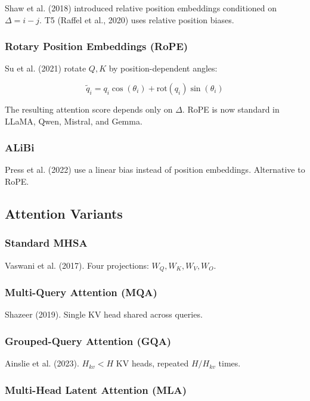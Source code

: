 {Shaw et al. (2018) introduced relative position embeddings conditioned on 
$\Delta = i - j$. T5 (Raffel et al., 2020) uses relative position biases.

\subsubsection{Rotary Position Embeddings (RoPE)}

Su et al. (2021) rotate $Q, K$ by position-dependent angles:

\[
\tilde{q}_i = q_i \cos(\theta_i) + \mathrm{rot}(q_i) \sin(\theta_i)
\tag{2.1}
\]

The resulting attention score depends only on $\Delta$. RoPE is now 
standard in LLaMA, Qwen, Mistral, and Gemma.

\subsubsection{ALiBi}

Press et al. (2022) use a linear bias instead of position embeddings. 
Alternative to RoPE.

\subsection{Attention Variants}

\subsubsection{Standard MHSA}

Vaswani et al. (2017). Four projections: $W_Q, W_K, W_V, W_O$.

\subsubsection{Multi-Query Attention (MQA)}

Shazeer (2019). Single KV head shared across queries.

\subsubsection{Grouped-Query Attention (GQA)}

Ainslie et al. (2023). $H_{kv} < H$ KV heads, repeated $H / H_{kv}$ times.

\subsubsection{Multi-Head Latent Attention (MLA)}

}
